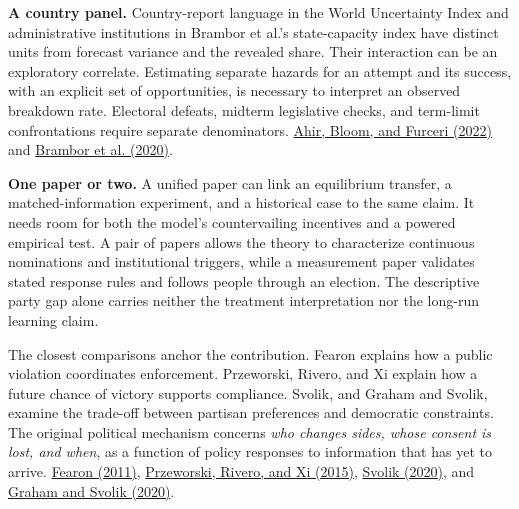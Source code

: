 \documentclass[11pt,letterpaper]{article}
\newcommand{\lead}[1]{\textbf{#1}\enspace}
\newcommand{\src}[2]{\href{#1}{#2}}
\begin{document}
\lead{A country panel.} Country-report language in the World Uncertainty Index and administrative institutions in Brambor et al.'s state-capacity index have distinct units from forecast variance and the revealed share. Their interaction can be an exploratory correlate. Estimating separate hazards for an attempt and its success, with an explicit set of opportunities, is necessary to interpret an observed breakdown rate. Electoral defeats, midterm legislative checks, and term-limit confrontations require separate denominators. \src{https://www.nber.org/papers/w29763}{Ahir, Bloom, and Furceri (2022)} and \src{https://doi.org/10.1177/0010414019843432}{Brambor et al. (2020)}.

\lead{One paper or two.} A unified paper can link an equilibrium transfer, a matched-information experiment, and a historical case to the same claim. It needs room for both the model's countervailing incentives and a powered empirical test. A pair of papers allows the theory to characterize continuous nominations and institutional triggers, while a measurement paper validates stated response rules and follows people through an election. The descriptive party gap alone carries neither the treatment interpretation nor the long-run learning claim.

The closest comparisons anchor the contribution. Fearon explains how a public violation coordinates enforcement. Przeworski, Rivero, and Xi explain how a future chance of victory supports compliance. Svolik, and Graham and Svolik, examine the trade-off between partisan preferences and democratic constraints. The original political mechanism concerns \emph{who changes sides, whose consent is lost, and when}, as a function of policy responses to information that has yet to arrive. \src{https://doi.org/10.1093/qje/qjr038}{Fearon (2011)}, \src{https://doi.org/10.1016/j.ejpoleco.2015.05.006}{Przeworski, Rivero, and Xi (2015)}, \src{https://bpb-us-w2.wpmucdn.com/campuspress.yale.edu/dist/6/1038/files/2020/08/Svolik-2020-QJPS.pdf}{Svolik (2020)}, and \src{https://doi.org/10.1017/S0003055420000052}{Graham and Svolik (2020)}.
\end{document}
